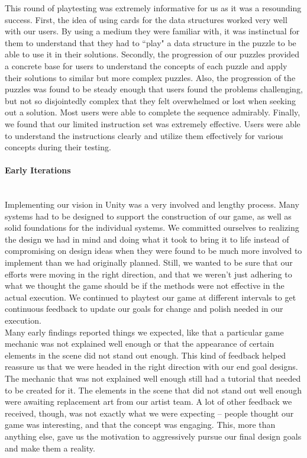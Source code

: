 This round of playtesting was extremely informative for us as it was a resounding success. First, the idea of using cards for the data structures worked very well with our users. By using a medium they were familiar with, it was instinctual for them to understand that they had to ``play" a data structure in the puzzle to be able to use it in their solutions. Secondly, the progression of our puzzles provided a concrete base for users to understand the concepts of each puzzle and apply their solutions to similar but more complex puzzles. Also, the progression of the puzzles was found to be steady enough that users found the problems challenging, but not so disjointedly complex that they felt overwhelmed or lost when seeking out a solution. Most users were able to complete the sequence admirably. Finally, we found that our limited instruction set was extremely effective. Users were able to understand the instructions clearly and utilize them effectively for various concepts during their testing.\\

\paragraph{Early Iterations}\mbox{} \\
Implementing our vision in Unity was a very involved and lengthy process. Many systems had to be designed to support the construction of our game, as well as solid foundations for the individual systems. We committed ourselves to realizing the design we had in mind and doing what it took to bring it to life instead of compromising on design ideas when they were found to be much more involved to implement than we had originally planned. Still, we wanted to be sure that our efforts were moving in the right direction, and that we weren't just adhering to what we thought the game should be if the methods were not effective in the actual execution. We continued to playtest our game at different intervals to get continuous feedback to update our goals for change and polish needed in our execution.\\

Many early findings reported things we expected, like that a particular game mechanic was not explained well enough or that the appearance of certain elements in the scene did not stand out enough. This kind of feedback helped reassure us that we were headed in the right direction with our end goal designs. The mechanic that was not explained well enough still had a tutorial that needed to be created for it. The elements in the scene that did not stand out well enough were awaiting replacement art from our artist team. A lot of other feedback we received, though, was not exactly what we were expecting -- people thought our game was interesting, and that the concept was engaging. This, more than anything else, gave us the motivation to aggressively pursue our final design goals and make them a reality.\\